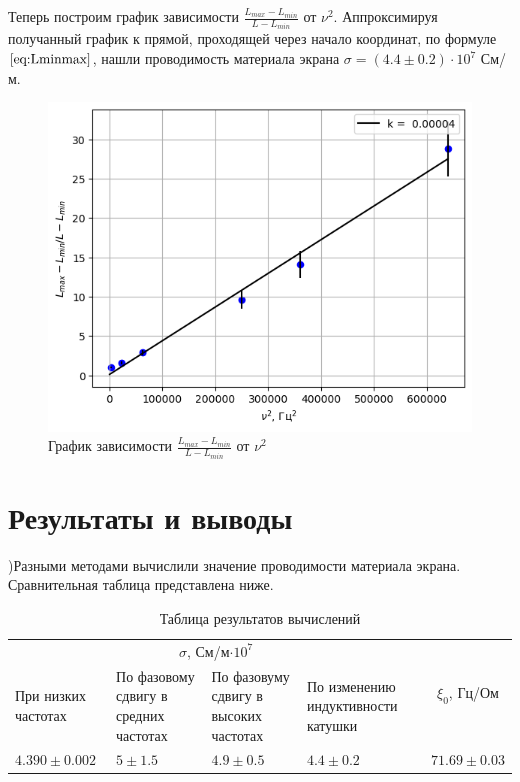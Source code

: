 \indent Теперь построим график зависимости $\frac{L_{max} - L_{min}}{L - L_{min}}$ от $\nu^2$. Аппроксимируя получанный график к прямой, проходящей через начало координат, по формуле $\ref{eq:Lminmax}$, нашли проводимость материала экрана $\sigma = (4.4\pm 0.2)\cdot 10^{7}$ См/м.

\begin{figure}[h!]
    \centering
    \includegraphics[width=12cm]{images/plot5.png}
    \caption{График зависимости $\frac{L_{max} - L_{min}}{L - L_{min}}$ от $\nu^2$}
\end{figure}


\section*{Результаты и выводы}
)Разными методами вычислили значение проводимости материала экрана. Сравнительная таблица представлена ниже.\\\indent

\begin{table}[h!]
    \centering
    \begin{tabular}{|p{3cm}|p{3.8cm}|p{4.2cm}|p{4cm}|c|}
        \hline
        \multicolumn{4}{|c|}{$\sigma$, См/м$\cdot 10^7$} & \multirow{2}{*}{$\xi_0$, Гц/Ом} \\
        При низких частотах & По фазовому сдвигу в средних частотах &  По фазовуму сдвигу в высоких частотах & По изменению индуктивности катушки & \\\hline
        $4.390\pm0.002$ & $5\pm1.5$ & $4.9\pm0.5$ & $4.4\pm0.2$ & $71.69\pm0.03$\\\hline
    \end{tabular}
    \caption{Таблица результатов вычислений}
\end{table}


